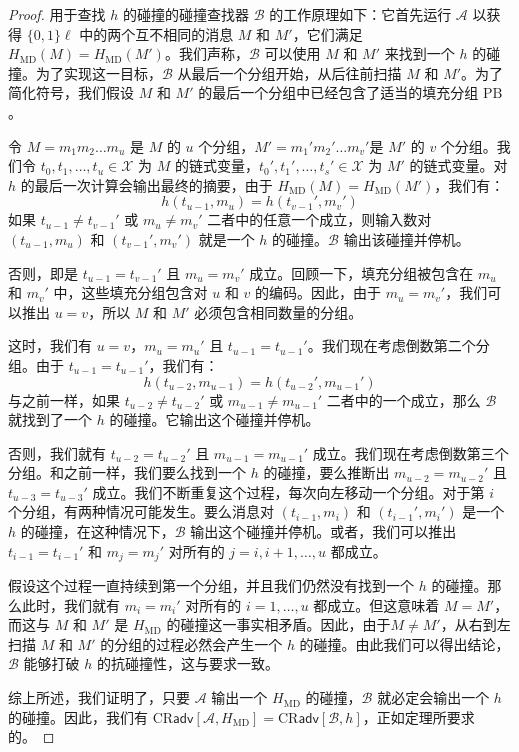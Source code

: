 \begin{proof}
用于查找 $h$ 的碰撞的碰撞查找器 $\mathcal{B}$ 的工作原理如下：它首先运行 $\mathcal{A}$ 以获得 $\{0,1\}\ell$ 中的两个互不相同的消息 $M$ 和 $M'$，它们满足 $H_\mathrm{MD}(M)=H_\mathrm{MD}(M')$。我们声称，$\mathcal{B}$ 可以使用 $M$ 和 $M'$ 来找到一个 $h$ 的碰撞。为了实现这一目标，$\mathcal{B}$ 从最后一个分组开始，从后往前扫描 $M$ 和 $M'$。为了简化符号，我们假设 $M$ 和 $M'$ 的最后一个分组中已经包含了适当的填充分组 $\mathrm{PB}$。

令 $M=m_1m_2\dots m_u$ 是 $M$ 的 $u$ 个分组，$M'=m_1'm_2'\dots m_v'$是 $M'$ 的 $v$ 个分组。我们令 $t_0,t_1,\dots,t_u\in\mathcal{X}$ 为 $M$ 的链式变量，$t_0',t_1',\dots,t_s'\in\mathcal{X}$ 为 $M'$ 的链式变量。对 $h$ 的最后一次计算会输出最终的摘要，由于 $H_\mathrm{MD}(M)=H_\mathrm{MD}(M')$，我们有：
\[
h(t_{u-1},m_u)=h(t_{v-1}',m_v')
\]
如果 $t_{u-1}\neq t_{v-1}'$ 或 $m_u\neq m_v'$ 二者中的任意一个成立，则输入数对 $(t_{u-1},m_u)$ 和 $(t_{v-1}',m_v')$ 就是一个 $h$ 的碰撞。$\mathcal{B}$ 输出该碰撞并停机。

否则，即是 $t_{u-1}=t_{v-1}'$ 且 $m_u=m_v'$ 成立。回顾一下，填充分组被包含在 $m_u$ 和 $m_v'$ 中，这些填充分组包含对 $u$ 和 $v$ 的编码。因此，由于 $m_u=m_v'$，我们可以推出 $u=v$，所以 $M$ 和 $M'$ 必须包含相同数量的分组。

这时，我们有 $u=v$，$m_u=m_u'$ 且 $t_{u-1}=t_{u-1}'$。我们现在考虑倒数第二个分组。由于 $t_{u-1}=t_{u-1}'$，我们有：
\[
h(t_{u-2},m_{u-1})=h(t_{u-2}',m_{u-1}')
\]
与之前一样，如果 $t_{u-2}\neq t_{u-2}'$ 或 $m_{u-1}\neq m_{u-1}'$ 二者中的一个成立，那么 $\mathcal{B}$ 就找到了一个 $h$ 的碰撞。它输出这个碰撞并停机。

否则，我们就有 $t_{u-2}=t_{u-2}'$ 且 $m_{u-1}=m_{u-1}'$ 成立。我们现在考虑倒数第三个分组。和之前一样，我们要么找到一个 $h$ 的碰撞，要么推断出 $m_{u-2}=m_{u-2}'$ 且 $t_{u-3}=t_{u-3}'$ 成立。我们不断重复这个过程，每次向左移动一个分组。对于第 $i$ 个分组，有两种情况可能发生。要么消息对 $(t_{i-1},m_i)$ 和 $(t_{i-1}',m_i')$ 是一个 $h$ 的碰撞，在这种情况下，$\mathcal{B}$ 输出这个碰撞并停机。或者，我们可以推出 $t_{i-1}=t_{i-1}'$ 和 $m_j=m_j'$ 对所有的 $j=i,i+1,\dots,u$ 都成立。

假设这个过程一直持续到第一个分组，并且我们仍然没有找到一个 $h$ 的碰撞。那么此时，我们就有 $m_i=m_i'$ 对所有的 $i=1,\dots,u$ 都成立。但这意味着 $M=M'$，而这与 $M$ 和 $M'$ 是 $H_\mathrm{MD}$ 的碰撞这一事实相矛盾。因此，由于$M\neq M'$，从右到左扫描 $M$ 和 $M'$ 的分组的过程必然会产生一个 $h$ 的碰撞。由此我们可以得出结论，$\mathcal{B}$ 能够打破 $h$ 的抗碰撞性，这与要求一致。

综上所述，我们证明了，只要 $\mathcal{A}$ 输出一个 $H_\mathrm{MD}$ 的碰撞，$\mathcal{B}$ 就必定会输出一个 $h$ 的碰撞。因此，我们有 $\mathrm{CR}\mathsf{adv}[\mathcal{A},H_\mathrm{MD}]=\mathrm{CR}\mathsf{adv}[\mathcal{B},h]$，正如定理所要求的。
\end{proof}

